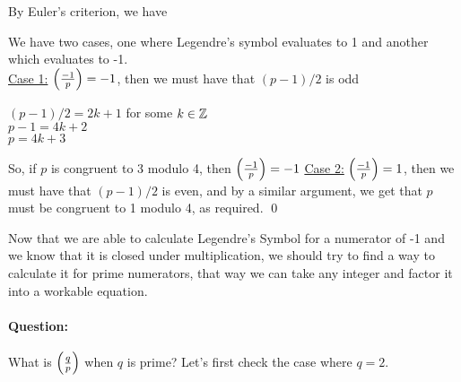 \documentclass[../main.tex]{subfiles}
\begin{document}
\begin{pf}
    By Euler's criterion, we have \\
    \centerline{} We have two cases, one where Legendre's symbol evaluates to 1 and another which evaluates to -1. \\
    \underline{Case 1:} $\Big(\frac{-1}{p}\Big)=-1$, then we must have that $(p-1)/2$ is odd
    \begin{center}
        $(p-1)/2=2k+1$ for some $k \in \mathbb{Z}$ \\
        $p-1=4k+2$ \\
        $p=4k + 3$
    \end{center}
    So, if $p$ is congruent to 3 modulo 4, then $\Big(\frac{-1}{p}\Big)=-1$ \sspace
    \underline{Case 2:} $\Big(\frac{-1}{p}\Big)=1$, then we must have that $(p-1)/2$ is even, and by a similar argument, we get that $p$ must be congruent to 1 modulo 4, as required. \qed
\end{pf}
Now that we are able to calculate Legendre's Symbol for a numerator of -1 and we know that it is closed under multiplication, we should try to find a way to calculate it for prime numerators, that way we can take any integer and factor it into a workable equation.
\paragraph{Question:} What is $\Big(\frac{q}{p}\Big)$ when $q$ is prime?
Let's first check the case where $q=2$.
\end{document}
